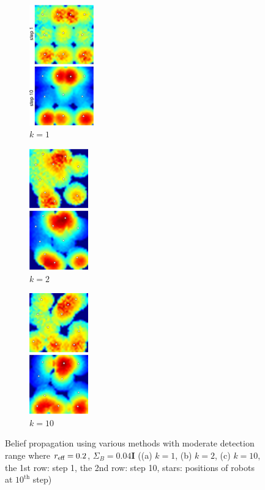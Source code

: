 \documentclass[letterpaper, 10 pt, conference]{ieeeconf}
\begin{document}
\begin{figure}
	\centering
	 \begin{subfigure}[b]{0.165\textwidth}
	 	\centering
		\includegraphics[width=1.093in]{figure/order1_step_0110_c}
		\caption{$k=1$}
	\end{subfigure}
	\begin{subfigure}[b]{0.15\textwidth}
		\centering
		\includegraphics[width=1in]{figure/order2_step_0110_c}
		\caption{$k=2$}
	\end{subfigure}
	 \begin{subfigure}[b]{0.15\textwidth}
	\centering
	\includegraphics[width=1in]{figure/ordern_step_0110_c}
	\caption{$k=10$}
\end{subfigure}
	\caption{Belief propagation using various methods with moderate detection range where $r_{\textup{eff}} = 0.2$, $\Sigma_B = 0.04\mathbf{I}$ ((a) $k=1$, (b) $k=2$, (c) $k=10$, the 1st row: step 1, the 2nd row: step 10, stars: positions of robots at $10^{\text{th}}$ step)}
	\label{fig:fig3}
\end{figure}
\end{document}
